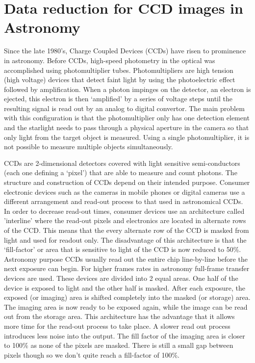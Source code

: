 \section{Data reduction for CCD images in Astronomy}
Since the late 1980's, Charge Coupled Devices (CCDs) have risen to prominence in astronomy. Before CCDs, high-speed photometry in the optical was accomplished using photomultiplier tubes. Photomultipliers are high tension (high voltage) devices that detect faint light by using the photoelectric effect followed by amplification. When a photon impinges on the detector, an electron is ejected, this electron is then `amplified' by a series of voltage steps until the resulting signal is read out by an analog to digital convertor. The main problem with this configuration is that the photomultiplier only has one detection element and the starlight needs to pass through a physical aperture in the camera so that only light from the target object is measured. Using a single photomultiplier, it is not possible to measure multiple objects simultaneously. 

CCDs are 2-dimensional detectors covered with light sensitive semi-conductors (each one defining a `pixel') that are able to measure and count photons. The structure and construction of CCDs depend on their intended purpose. Consumer electronic devices such as the cameras in mobile phones or digital cameras use a different arrangement and read-out process to that used in astronomical CCDs. In order to decrease read-out times, consumer devices use an architecture called 'interline' where the read-out pixels and electronics are located in alternate rows of the CCD. This means that the every alternate row of the CCD is masked from light and used for readout only. The disadvantage of this architecture is that the `fill-factor' or area that is sensitive to light of the CCD is now reduced to 50\%. Astronomy purpose CCDs usually read out the entire chip line-by-line before the next exposure can begin. For higher frames rates in astronomy full-frame transfer devices are used. These devices are divided into 2 equal areas. One half of the device is exposed to light and the other half is masked. After each exposure, the exposed (or imaging) area is shifted completely into the masked (or storage) area. The imaging area is now ready to be exposed again, while the image can be read out from the storage area. This architecture has the advantage that it allows more time for the read-out process to take place. A slower read out process introduces less noise into the output. The fill factor of the imaging area is closer to 100\% as none of the pixels are masked. There is still a small gap between pixels though so we don't quite reach a fill-factor of 100\%. 

